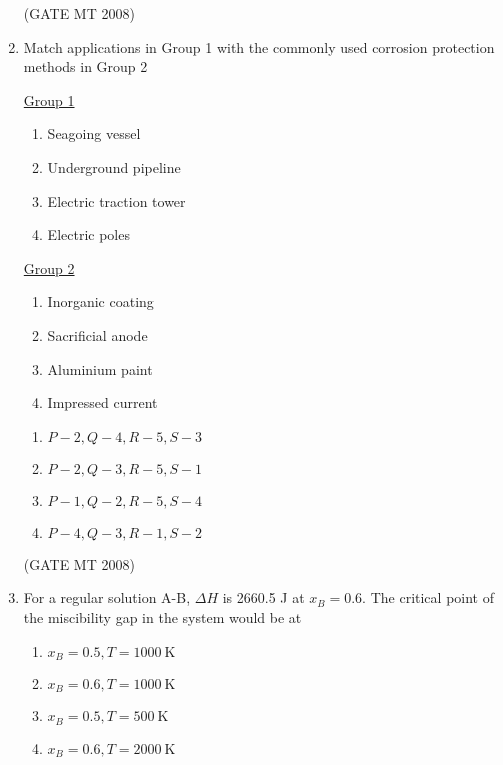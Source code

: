 \documentclass[11pt, letterpaper]{article}
\theoremstyle{remark}
\begin{document}
\begin{enumerate}
\hfill(GATE MT 2008)

\item Match applications in Group 1 with the commonly used corrosion protection methods in Group 2
\begin{multicols}{2}
\underline{Group 1}
\begin{enumerate}[label=(\Alph*), start=16]
\item Seagoing vessel
\item Underground pipeline
\item Electric traction tower
\item Electric poles
\end{enumerate}

\underline{Group 2}
\begin{enumerate}[label=(\arabic*), start=1]
\item Inorganic coating
\item Sacrificial anode
\item Aluminium paint
\item Impressed current
\end{enumerate}
\end{multicols}

\begin{multicols}{2}
\begin{enumerate}
\item $P-2, Q-4, R-5, S-3$
\item $P-2, Q-3, R-5, S-1$
\item $P-1, Q-2, R-5, S-4$
\item $P-4, Q-3, R-1, S-2$
\end{enumerate}
\end{multicols}
\hfill(GATE MT 2008) 

\item For a regular solution A-B, $\Delta H$ is 2660.5 J at $x_B = 0.6$. The critical point of the miscibility gap in the system would be at

\begin{multicols}{2}
\begin{enumerate}
\item $x_B = 0.5, T = 1000 \ \mathrm{K}$
\item $x_B = 0.6, T = 1000 \ \mathrm{K}$
\item $x_B = 0.5, T = 500 \ \mathrm{K}$
\item $x_B = 0.6, T = 2000 \ \mathrm{K}$
\end{enumerate}
\end{multicols}


\end{enumerate}
\end{document}
